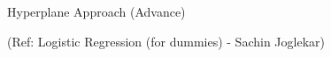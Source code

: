 

%
%


\begin{frame}[fragile]\frametitle{}
\begin{center}
{\Large Hyperplane Approach (Advance)}
\end{center}

{\tiny (Ref: Logistic Regression (for dummies) - Sachin Joglekar)}
\end{frame}

